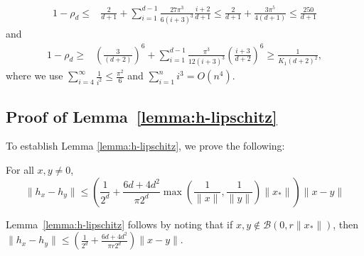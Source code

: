 \begin{align*}
1 - \rho_d \leq& \frac{2}{d + 1} + \sum_{i = 1}^{d - 1} \frac{27 \pi^3}{6 (i + 3)^3} \frac{i + 2}{d + 1} \leq \frac{2}{d + 1} + \frac{3 \pi^5}{4 (d + 1)} \leq \frac{250}{d + 1}
\end{align*}
and
\begin{align*}
1 - \rho_d \geq& \left(\frac{3}{(d+2)}\right)^6 + \sum_{i = 1}^{d - 1} \frac{\pi^3}{12 (i + 3)^3} \left( \frac{i + 3}{d + 2} \right)^6 \geq \frac{1}{K_1 (d + 2)^2},
\end{align*}
where we use $\sum_{i = 4}^\infty \frac{1}{i^2} \leq \frac{\pi^2}{6}$ and $\sum_{i = 1}^n i^3 = O(n^4)$.




\subsection{\label{sec:prooflemma:h-lipschitz}Proof of Lemma~\ref{lemma:h-lipschitz}}
To establish Lemma \ref{lemma:h-lipschitz}, we prove the following:

\begin{lemma} 
\label{GA:le4}
For all $x, y \neq 0$, 
\begin{equation*}
\|h_{x} - h_{y}\| \leq \left(\frac{1}{2^d} + \frac{6 d + 4 d^2}{\pi 2^d} \max\left( \frac{1}{\|x\|}, \frac{1}{\|y\|} \right) \|x_*\|\right) \|x - y\|
\end{equation*}
\end{lemma}
%
Lemma~\ref{lemma:h-lipschitz} follows by noting that if $x, y \notin \mathcal{B}(0, r \|x_*\|)$, then $\|h_{x} - h_{y}\| \leq \left(\frac{1}{2^d} + \frac{6 d + 4 d^2}{\pi r 2^d}\right) \|x - y\|$.

